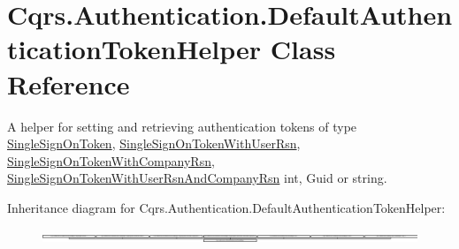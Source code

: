 \hypertarget{classCqrs_1_1Authentication_1_1DefaultAuthenticationTokenHelper}{}\section{Cqrs.\+Authentication.\+Default\+Authentication\+Token\+Helper Class Reference}
\label{classCqrs_1_1Authentication_1_1DefaultAuthenticationTokenHelper}


A helper for setting and retrieving authentication tokens of type \hyperlink{classCqrs_1_1Authentication_1_1SingleSignOnToken}{Single\+Sign\+On\+Token}, \hyperlink{classCqrs_1_1Authentication_1_1SingleSignOnTokenWithUserRsn}{Single\+Sign\+On\+Token\+With\+User\+Rsn}, \hyperlink{classCqrs_1_1Authentication_1_1SingleSignOnTokenWithCompanyRsn}{Single\+Sign\+On\+Token\+With\+Company\+Rsn}, \hyperlink{classCqrs_1_1Authentication_1_1SingleSignOnTokenWithUserRsnAndCompanyRsn}{Single\+Sign\+On\+Token\+With\+User\+Rsn\+And\+Company\+Rsn} int, Guid or string.  


Inheritance diagram for Cqrs.\+Authentication.\+Default\+Authentication\+Token\+Helper\+:\begin{figure}[H]
\begin{center}
\leavevmode
\includegraphics[height=0.270270cm]{classCqrs_1_1Authentication_1_1DefaultAuthenticationTokenHelper}
\end{center}
\end{figure}

